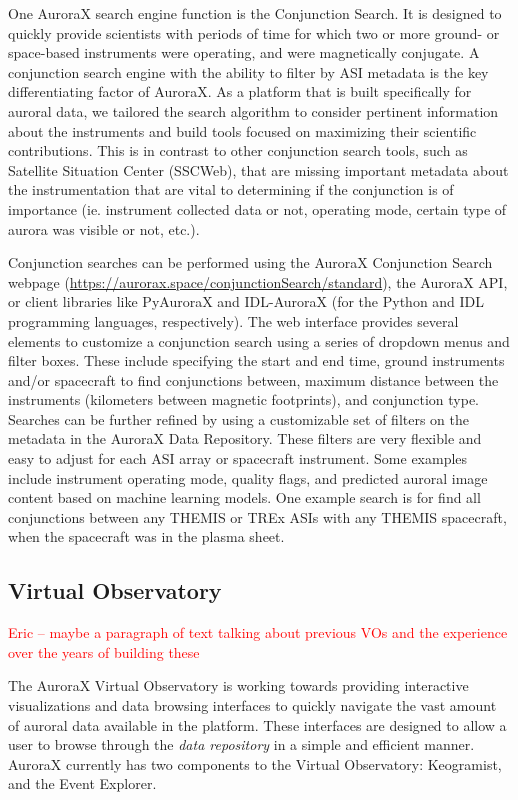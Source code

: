 \documentclass[utf8]{FrontiersinHarvard} %
\begin{document}
One AuroraX search engine function is the Conjunction Search. It is designed to quickly provide scientists with periods of time for which two or more ground- or space-based instruments were operating, and were magnetically conjugate. A conjunction search engine with the ability to filter by ASI metadata is the key differentiating factor of AuroraX. As a platform that is built specifically for auroral data, we tailored the search algorithm to consider pertinent information about the instruments and build tools focused on maximizing their scientific contributions. This is in contrast to other conjunction search tools, such as Satellite Situation Center (SSCWeb), that are missing important metadata about the instrumentation that are vital to determining if the conjunction is of importance (ie. instrument collected data or not, operating mode, certain type of aurora was visible or not, etc.).

Conjunction searches can be performed using the AuroraX Conjunction Search webpage (\url{https://aurorax.space/conjunctionSearch/standard}), the AuroraX API, or client libraries like PyAuroraX and IDL-AuroraX (for the Python and IDL programming languages, respectively). The web interface provides several elements to customize a conjunction search using a series of dropdown menus and filter boxes. These include specifying the start and end time, ground instruments and/or spacecraft to find conjunctions between, maximum distance between the instruments (kilometers between magnetic footprints), and conjunction type. Searches can be further refined by using a customizable set of filters on the metadata in the AuroraX Data Repository. These filters are very flexible and easy to adjust for each ASI array or spacecraft instrument. Some examples include instrument operating mode, quality flags, and predicted auroral image content based on machine learning models. One example search is for find all conjunctions between any THEMIS or TREx ASIs with any THEMIS spacecraft, when the spacecraft was in the plasma sheet.

\subsection{Virtual Observatory}
\textcolor{red}{Eric – maybe a paragraph of text talking about previous VOs and the experience over the years of building these}

The AuroraX Virtual Observatory is working towards providing interactive visualizations and data browsing interfaces to quickly navigate the vast amount of auroral data available in the platform. These interfaces are designed to allow a user to browse through the \textit{data repository} in a simple and efficient manner. AuroraX currently has two components to the Virtual Observatory: Keogramist, and the Event Explorer.
\end{document}
